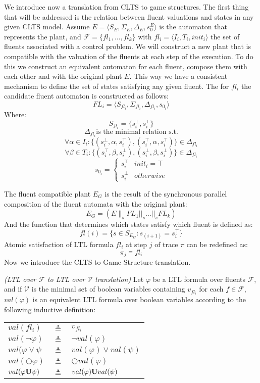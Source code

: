 We introduce now a translation from CLTS to game structures.
The first thing that will be addressed is the relation between fluent valuations and states in any given CLTS model. Assume $E = \langle S_E, \Sigma_E, \Delta_E, s^E_0 \rangle$ is the automaton that represents the plant, and $\mathcal{F}=\{fl_1,\ldots,fl_k\}$ with $fl_i = \langle I_i, T_i, init_i \rangle$ the set of fluents associated with a control problem. We will construct a new plant that is compatible with the valuation of the fluents at each step of the execution. To do this we construct an equivalent automaton for each fluent, compose them with each other and with the original plant $E$. This way we have a consistent mechanism to define the set of states satisfying any given fluent.  The for $fl_i$ the candidate fluent automaton is constructed as follows:
\[ FL_i = \langle S_{fl_i}, \Sigma_{fl_i}, \Delta_{fl_i}, s_{0_i}\rangle \]
Where:
\[S_{fl_i}= \{s^{\bot}_i, s^{\top}_i\} \]
\[\Delta_{fl_i} \text{is the minimal relation s.t.}\]
\[ \forall \alpha \in I_i: \{(s^{\bot}_i,\alpha,s^{\top}_i), (s^{\top}_i,\alpha,s^{\top}_i)\} \in \Delta_{fl_i} \]
\[ \forall \beta \in T_i: \{(s^{\top}_i,\beta,s^{\bot}_i), (s^{\bot}_i,\beta,s^{\bot}_i)\} \in \Delta_{fl_i} \]
\[
s_{0_i} = \begin{cases}
s^{\top}_i & init_i = \top \\
s^{\bot}_i & otherwise
\end{cases}
\]

The fluent compatible plant $E_G$ is the result of the synchronous parallel composition of the fluent automata with the original plant:
\[E_G = (E \parallel_s FL_1 ||_s \ldots ||_s FL_k) \]
And the function that determines which states satisfy which fluent is defined as:
\[ fl(i) = \{s \in S_{E_G} : s_{(i + 1)} = s^{\top}_i \} \]
Atomic satisfaction of LTL formula $fl_i$ at step $j$ of trace $\pi$ can be redefined as:
\[ \pi_j \models fl_i \]
Now we introduce the CLTS to Game Structure translation.
\begin{definition}
	\label{def:val_ltl} \emph{(LTL over $\mathcal{F}$ to LTL over $\mathcal{V}$ translation)} 
	Let $\varphi$ be a LTL formula over fluents $\mathcal{F}$, and if $\mathcal{V}$ is the minimal set of boolean variables containing $v_{fl_i}$ for each $f \in \mathcal{F}$, $val(\varphi)$ is an equivalent LTL formula over boolean variables according to the following inductive definition:\\
	
	\begin{tabular}{ l c l }
		$val(fl_i)$ & $\triangleq$ & $v_{fl_i}$\\	
		$val(\neg \varphi)$ & $\triangleq$ & $\neg val(\varphi)$\\
		$val(\varphi \vee \psi$ & $\triangleq$ & $val(\varphi) \vee val(\psi)$\\
		$val(\bigcirc \varphi)$ & $\triangleq$ & $\bigcirc val(\varphi)$\\
		$val(\varphi {\bf U} \psi)$ & $\triangleq$ & $val(\varphi) {\bf U} val(\psi)$\\
	\end{tabular}	
\end{definition}

